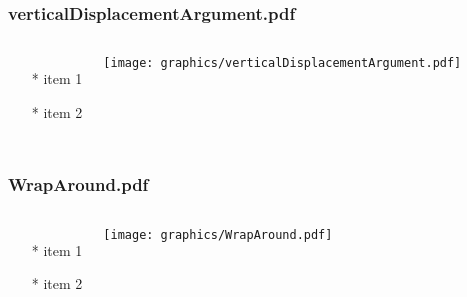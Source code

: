 \documentclass{beamer}
\begin{document}
\begin{frame} \frametitle{verticalDisplacementArgument.pdf}
    \begin{columns}[c]
        \begin{itemize}
            \item[*] item 1
            \item[*] item 2
        \end{itemize}
        \begin{minipage}{\linewidth}
            \begin{center}
            \texttt{[image: graphics/verticalDisplacementArgument.pdf]}
            \label{gfx:verticalDisplacementArgument.pdf}
            \end{center}
        \end{minipage}
    \end{columns}
\end{frame}
\begin{frame} \frametitle{WrapAround.pdf}
    \begin{columns}[c]
        \begin{itemize}
            \item[*] item 1
            \item[*] item 2
        \end{itemize}
        \begin{minipage}{\linewidth}
            \begin{center}
            \texttt{[image: graphics/WrapAround.pdf]}
            \label{gfx:WrapAround.pdf}
            \end{center}
        \end{minipage}
    \end{columns}
\end{frame}
\end{document}
